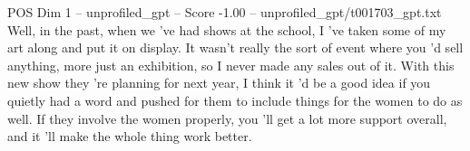 \begin{textsample}{POS Dim 1 – unprofiled\_gpt – Score -1.00 – unprofiled\_gpt/t001703\_gpt.txt}  \label{ex:f1_pos_021}
Well, in the past, when we ’ve had shows at the school, I ’ve taken some of my art along and put it on display.
It wasn't really the sort of event where you ’d sell anything, more just an exhibition, so I never made any sales out of it.
With this new show they ’re planning for next year, I think it ’d be a good idea if you quietly had a word and pushed for them to include things for the women to do as well.
If they involve the women properly, you ’ll get a lot more support overall, and it ’ll make the whole thing work better.

\end{textsample}
